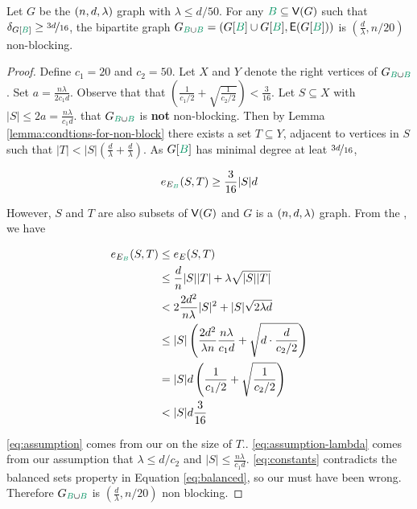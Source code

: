 \documentclass[11pt]{article}
\begin{document}
\begin{lemma}\label{lemma:bipartitie-is-non-blocking}Let $G$ be the $(n, d, \lambda)$ graph with $\lambda \leq d/50$. For any $\GreenB \subseteq \Vertices{G}$ such that $\MinimalDegree{G[\GreenB]} \geq \nicefrac{3d}{16}$,
 the bipartite graph  $\BipartiteG = (G[\GreenB] \cup G[\GreenB], \Edges{G[\GreenB]})$ is $(\frac{d}{\lambda},  n/20)$ non-blocking.
\end{lemma}

\begin{proof}
  Define $c_1 = 20$ and $c_2 = 50$. Let $X$ and $Y$ denote the right vertices of $\BipartiteG$.
  Set $a = \frac{n\lambda}{2c_1 d}$.
  Observe that that $\left(\frac{1}{c_1/2}  + \sqrt{\frac{1}{c_2/2}}\right) < \frac{3}{16}$.
Let $S \subseteq X$ with $|S| \leq 2a = \frac{n\lambda}{c_1 d}$.
 that $\BipartiteG$ is \textbf{not} non-blocking.
  Then by Lemma \ref{lemma:condtions-for-non-block} there exists a set $T \subseteq Y$, adjacent to vertices in $S$ such that $|T| < |S|(\frac{d}{\lambda}+\frac{d}{\lambda})$.
As $G[\GreenB]$ has minimal degree at leat $\nicefrac{3d}{16}$,

\begin{equation}\label{eq:balanced}
  \CutEdges{S}{T}{E_{\GreenB}} \geq \frac{3}{16}|S|d
\end{equation}

However, $S$ and $T$ are also subsets of $\mathsf{V}(G)$ and $G$ is a $(n, d, \lambda)$ graph.
From the , we have

\begin{align}
  \CutEdges{S}{T}{E_{\GreenB}} &\leq   \CutEdges{S}{T}{E} \\
  &\leq \frac{d}{n}|S||T| + \lambda\sqrt{|S||T|} \\
	&< 2\frac{2d^2}{n\lambda}|S|^2 + |S|\sqrt{2\lambda d} \label{eq:assumption}\\
	&\leq |S|\left(\frac{2d^2}{\lambda n} \frac{n\lambda}{c_1 d} + \sqrt{d\cdot \frac{d}{c_2/2}}\right) \label{eq:assumption-lambda}\\
	&= |S|d\left(\frac{1}{c_1/2}  + \sqrt{\frac{1}{c_2/2}}\right) \\
	&< |S|d\frac{3}{16} \label{eq:constants}
\end{align}

\eqref{eq:assumption} comes from our  on the size of $T$..
\eqref{eq:assumption-lambda} comes from our assumption that $\lambda \leq  d/c_2$ and $|S| \leq \frac{n\lambda}{c_1 d}$.
\eqref{eq:constants} contradicts the balanced sets property in Equation \eqref{eq:balanced}, so our  must have been wrong.
Therefore $\BipartiteG$ is $(\frac{d}{\lambda}, n/20)$ non blocking.
\end{proof}
\end{document}
